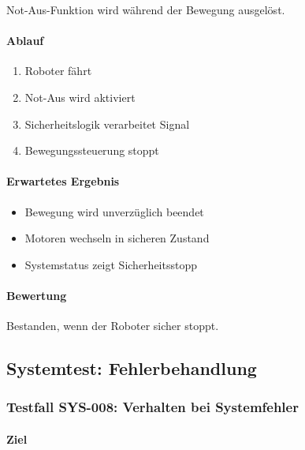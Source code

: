 \documentclass[
  a4paper,
  12pt,
  DIV=12,        %
  parskip=half,  %
  headings=small %
]{scrartcl}
\theoremstyle{definition}
\providecommand{\tightlist}{%
  \setlength{\itemsep}{0pt}\setlength{\parskip}{0pt}}
\theoremstyle{definition}
\begin{document}
Not-Aus-Funktion wird während der Bewegung ausgelöst.

\paragraph{Ablauf}\label{ablauf-30}

\begin{enumerate}
\def\labelenumi{\arabic{enumi}.}
\tightlist
\item
  Roboter fährt
\item
  Not-Aus wird aktiviert
\item
  Sicherheitslogik verarbeitet Signal
\item
  Bewegungssteuerung stoppt
\end{enumerate}

\paragraph{Erwartetes Ergebnis}\label{erwartetes-ergebnis-30}

\begin{itemize}
\tightlist
\item
  Bewegung wird unverzüglich beendet
\item
  Motoren wechseln in sicheren Zustand
\item
  Systemstatus zeigt Sicherheitsstopp
\end{itemize}

\paragraph{Bewertung}\label{bewertung-30}

Bestanden, wenn der Roboter sicher stoppt.

\subsection{Systemtest:
Fehlerbehandlung}\label{systemtest-fehlerbehandlung}

\subsubsection{Testfall SYS-008: Verhalten bei
Systemfehler}\label{testfall-sys-008-verhalten-bei-systemfehler}

\paragraph{Ziel}\label{ziel-31}
\end{document}
